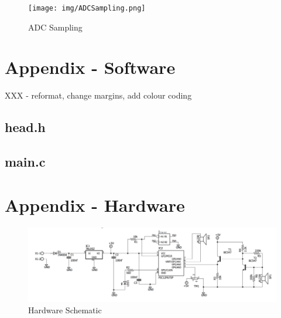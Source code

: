 \documentclass[a4paper]{article}
\begin{document}
\begin{figure}
    \centering
    \texttt{[image: img/ADCSampling.png]}
    \caption{ADC Sampling}
\end{figure}



\newpage
\pagestyle{empty}
\begin{landscape}

\section{Appendix - Software}
XXX - reformat, change margins, add colour coding
\subsection{head.h}

\newpage
\subsection{main.c}


\newpage
\section{Appendix - Hardware} \label{sect_hardware}

\begin{figure}[b!]
    \centering
    \includegraphics{img/hardware_schematic.PNG}
    \caption{Hardware Schematic}
    \label{fig:hardware_schematic}
\end{figure}


\end{landscape}
\end{document}
